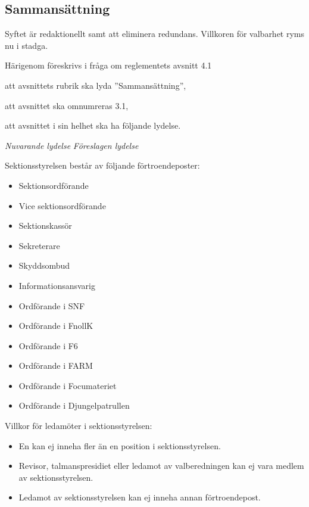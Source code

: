 \documentclass{article}
\newenvironment{lydelse}
    {\begin{paracol}{2}%
        \emph{Nuvarande lydelse}%
        \switchcolumn%
        \emph{Föreslagen lydelse}%
    \end{paracol}%
    \begin{enumerate}[label=\thesubsection.\arabic*]%
    \begin{paracol}{2}%
    }{\end{paracol}\end{enumerate}}
\begin{document}
\subsection{Sammansättning}
Syftet är redaktionellt samt att eliminera redundans.
Villkoren för valbarhet ryms nu i stadga.

Härigenom föreskrivs i fråga om reglementets avsnitt 4.1

\begin{dels}
    \item att avsnittets rubrik ska lyda ''Sammansättning'',
    \item att avsnittet ska omnumreras 3.1,
    \item att avsnittet i sin helhet ska ha följande lydelse.
\end{dels}

\begin{lydelse}
    \setcounter{section}{4}
    
    \item Sektionsstyrelsen består av följande förtroendeposter:
	\begin{itemize}
		\item Sektionsordförande
		\item Vice sektionsordförande
		\item Sektionskassör
		\item Sekreterare
		\item Skyddsombud
		\item Informationsansvarig
		\item Ordförande i SNF
		\item Ordförande i FnollK
		\item Ordförande i F6
		\item Ordförande i FARM
		\item Ordförande i Focumateriet
		\item Ordförande i Djungelpatrullen
	\end{itemize}

    \vspace{1ex}
	\item Villkor för ledamöter i sektionsstyrelsen:
	\begin{itemize}
		\item En kan ej inneha fler än en position i sektionsstyrelsen.
		\item Revisor, talmanspresidiet eller ledamot av valberedningen kan ej vara medlem av sektionsstyrelsen.
		\item Ledamot av sektionsstyrelsen kan ej inneha annan förtroendepost.
	\end{itemize}


\end{lydelse}
\end{document}

